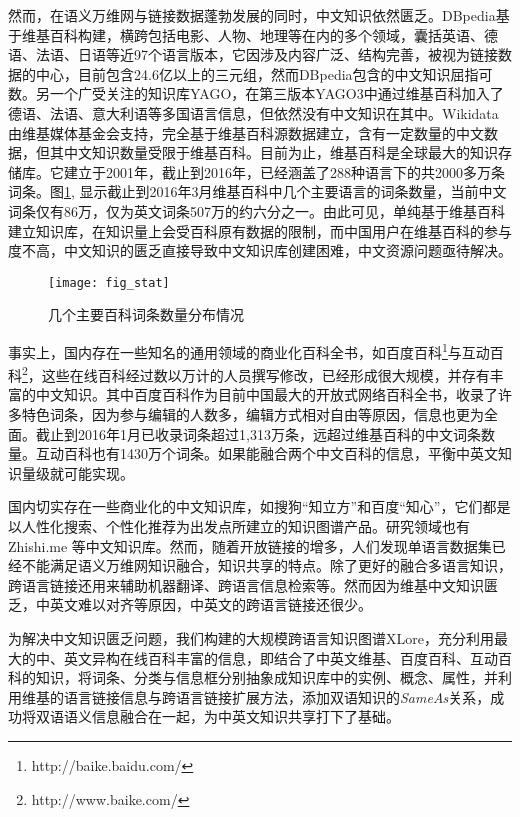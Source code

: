 然而，在语义万维网与链接数据蓬勃发展的同时，中文知识依然匮乏。DBpedia基于维基百科构建，横跨包括电影、人物、地理等在内的多个领域，囊括英语、德语、法语、日语等近97个语言版本，它因涉及内容广泛、结构完善，被视为链接数据的中心，目前包含24.6亿以上的三元组，然而DBpedia包含的中文知识屈指可数。另一个广受关注的知识库YAGO，在第三版本YAGO3中通过维基百科加入了德语、法语、意大利语等多国语言信息，但依然没有中文知识在其中。Wikidata由维基媒体基金会支持，完全基于维基百科源数据建立，含有一定数量的中文数据，但其中文知识数量受限于维基百科。目前为止，维基百科是全球最大的知识存储库。它建立于2001年，截止到2016年，已经涵盖了288种语言下的共2000多万条词条。图\ref{fig:wiki-stat}, 显示截止到2016年3月维基百科中几个主要语言的词条数量，当前中文词条仅有86万，仅为英文词条507万的约六分之一。由此可见，单纯基于维基百科建立知识库，在知识量上会受百科原有数据的限制，而中国用户在维基百科的参与度不高，中文知识的匮乏直接导致中文知识库创建困难，中文资源问题亟待解决。

\begin{figure}[H] %
  \centering
  \texttt{[image: fig\_stat]}
  \caption{几个主要百科词条数量分布情况}
  \label{fig:wiki-stat}
\end{figure}

事实上，国内存在一些知名的通用领域的商业化百科全书，如百度百科\footnote{http://baike.baidu.com/}与互动百科\footnote{http://www.baike.com/}，这些在线百科经过数以万计的人员撰写修改，已经形成很大规模，并存有丰富的中文知识。其中百度百科作为目前中国最大的开放式网络百科全书，收录了许多特色词条，因为参与编辑的人数多，编辑方式相对自由等原因，信息也更为全面。截止到2016年1月已收录词条超过1,313万条，远超过维基百科的中文词条数量。互动百科也有1430万个词条。如果能融合两个中文百科的信息，平衡中英文知识量级就可能实现。

国内切实存在一些商业化的中文知识库，如搜狗“知立方”和百度“知心”，它们都是以人性化搜索、个性化推荐为出发点所建立的知识图谱产品。研究领域也有Zhishi.me\cite{niu2011zhishi} 等中文知识库。然而，随着开放链接的增多，人们发现单语言数据集已经不能满足语义万维网知识融合，知识共享的特点。除了更好的融合多语言知识，跨语言链接还用来辅助机器翻译\cite{niehues2011using}、跨语言信息检索\cite{giang2015building}等。然而因为维基中文知识匮乏，中英文难以对齐等原因，中英文的跨语言链接还很少。

为解决中文知识匮乏问题，我们构建的大规模跨语言知识图谱XLore，充分利用最大的中、英文异构在线百科丰富的信息，即结合了中英文维基、百度百科、互动百科的知识，将词条、分类与信息框分别抽象成知识库中的实例、概念、属性，并利用维基的语言链接信息与跨语言链接扩展方法\cite{wang2012cross}，添加双语知识的\textit{SameAs}关系，成功将双语语义信息融合在一起，为中英文知识共享打下了基础。

